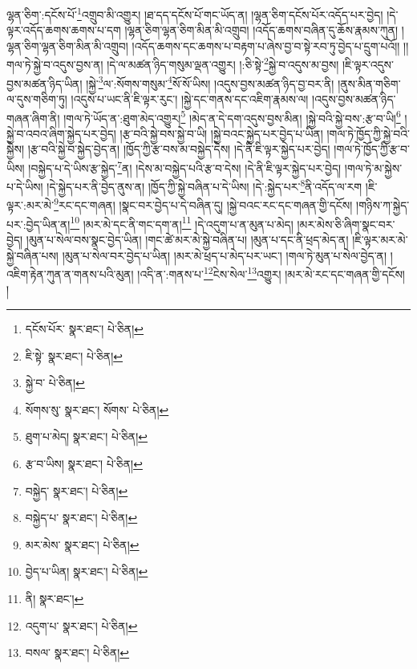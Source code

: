 ལྷན་ཅིག་:དངོས་པོ་\footnote{དངོས་པོར་  སྣར་ཐང་།  པེ་ཅིན། }འགྲུབ་མི་འགྱུར། །ཐ་དད་དངོས་པོ་གང་ཡོད་ན། །ལྷན་ཅིག་དངོས་པོར་འདོད་པར་བྱེད། །དེ་ལྟར་འདོད་ཆགས་ཆགས་པ་དག །ལྷན་ཅིག་ལྷན་ཅིག་མིན་མི་འགྲུབ། །འདོད་ཆགས་བཞིན་དུ་ཆོས་རྣམས་ཀུན། །ལྷན་ཅིག་ལྷན་ཅིག་མིན་མི་འགྲུབ། །འདོད་ཆགས་དང་ཆགས་པ་བརྟག་པ་ཞེས་བྱ་བ་སྟེ་རབ་ཏུ་བྱེད་པ་དྲུག་པའོ།། །།གལ་ཏེ་སྐྱེ་བ་འདུས་བྱས་ན། །དེ་ལ་མཚན་ཉིད་གསུམ་ལྡན་འགྱུར། །:ཅི་སྟེ་\footnote{ཇི་སྟེ་  སྣར་ཐང་།  པེ་ཅིན། }སྐྱེ་བ་འདུས་མ་བྱས། །ཇི་ལྟར་འདུས་བྱས་མཚན་ཉིད་ཡིན། །སྐྱེ་\footnote{སྐྱེ་བ་  པེ་ཅིན། }ལ་:སོགས་གསུམ་\footnote{སོགས་སུ་  སྣར་ཐང་། སོགས་  པེ་ཅིན། }སོ་སོ་ཡིས། །འདུས་བྱས་མཚན་ཉིད་བྱ་བར་ནི། །ནུས་མིན་གཅིག་ལ་དུས་གཅིག་ཏུ། །འདུས་པ་ཡང་ནི་ཇི་ལྟར་རུང་། །སྐྱེ་དང་གནས་དང་འཇིག་རྣམས་ལ། །འདུས་བྱས་མཚན་ཉིད་གཞན་ཞིག་ནི། །གལ་ཏེ་ཡོད་ན་:ཐུག་མེད་འགྱུར།\footnote{ཐུག་པ་མེད།  སྣར་ཐང་།  པེ་ཅིན། } །མེད་ན་དེ་དག་འདུས་བྱས་མིན། །སྐྱེ་བའི་སྐྱེ་བས་:རྩ་བ་ཡི།\footnote{རྩ་བ་ཡིས།  སྣར་ཐང་།  པེ་ཅིན། } །སྐྱེ་བ་འབའ་ཞིག་སྐྱེད་པར་བྱེད། །རྩ་བའི་སྐྱེ་བས་སྐྱེ་བ་ཡི། །སྐྱེ་བའང་སྐྱེད་པར་བྱེད་པ་ཡིན། །གལ་ཏེ་ཁྱོད་ཀྱི་སྐྱེ་བའི་སྐྱེས། །རྩ་བའི་སྐྱེ་བ་སྐྱེད་བྱེད་ན། །ཁྱོད་ཀྱི་རྩ་བས་མ་བསྐྱེད་དེས། །དེ་ནི་ཇི་ལྟར་སྐྱེད་པར་བྱེད། །གལ་ཏེ་ཁྱོད་ཀྱི་རྩ་བ་ཡིས། །བསྐྱེད་པ་དེ་ཡིས་རྩ་སྐྱེད་\footnote{བསྐྱེད་  སྣར་ཐང་།  པེ་ཅིན། }ན། །དེས་མ་བསྐྱེད་པའི་རྩ་བ་དེས། །དེ་ནི་ཇི་ལྟར་སྐྱེད་པར་བྱེད། །གལ་ཏེ་མ་སྐྱེས་པ་དེ་ཡིས། །དེ་སྐྱེད་པར་ནི་བྱེད་ནུས་ན། །ཁྱོད་ཀྱི་སྐྱེ་བཞིན་པ་དེ་ཡིས། །དེ་:སྐྱེད་པར་\footnote{བསྐྱེད་པ་  སྣར་ཐང་།  པེ་ཅིན། }ནི་འདོད་ལ་རག །ཇི་ལྟར་:མར་མེ་\footnote{མར་མེས་  སྣར་ཐང་།  པེ་ཅིན། }རང་དང་གཞན། །སྣང་བར་བྱེད་པ་དེ་བཞིན་དུ། །སྐྱེ་བའང་རང་དང་གཞན་གྱི་དངོས། །གཉིས་ཀ་སྐྱེད་པར་:བྱེད་ཡིན་ན།\footnote{བྱེད་པ་ཡིན།  སྣར་ཐང་།  པེ་ཅིན། } །མར་མེ་དང་ནི་གང་དག་ན།\footnote{ནི།  སྣར་ཐང་། } །དེ་འདུག་པ་ན་མུན་པ་མེད། །མར་མེས་ཅི་ཞིག་སྣང་བར་བྱེད། །མུན་པ་སེལ་བས་སྣང་བྱེད་ཡིན། །གང་ཚེ་མར་མེ་སྐྱེ་བཞིན་པ། །མུན་པ་དང་ནི་ཕྲད་མེད་ན། །ཇི་ལྟར་མར་མེ་སྐྱེ་བཞིན་པས། །མུན་པ་སེལ་བར་བྱེད་པ་ཡིན། །མར་མེ་ཕྲད་པ་མེད་པར་ཡང་། །གལ་ཏེ་མུན་པ་སེལ་བྱེད་ན། །འཇིག་རྟེན་ཀུན་ན་གནས་པའི་མུན། །འདི་ན་:གནས་པ་\footnote{འདུག་པ་  སྣར་ཐང་།  པེ་ཅིན། }ངེས་སེལ་\footnote{བསལ་  སྣར་ཐང་།  པེ་ཅིན། }འགྱུར། །མར་མེ་རང་དང་གཞན་གྱི་དངོས། །
